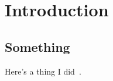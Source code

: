 \chapter{Introduction} 
\label{ch:introduction}

\minitoc
\section{Something}
Here's a thing I did~\cite{LHCb-PAPER-2017-032}. 
